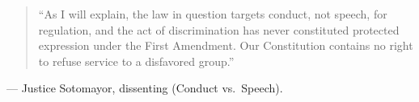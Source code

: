 \documentclass[12pt]{article}
\begin{document}
\begin{quote}
``As I will explain, the law in question targets conduct, not speech, for regulation, and the act of discrimination has never constituted protected expression under the First Amendment. Our Constitution contains no right to refuse service to a disfavored group.''
\end{quote}
\noindent --- Justice Sotomayor, dissenting (Conduct vs.\ Speech).
\end{document}
